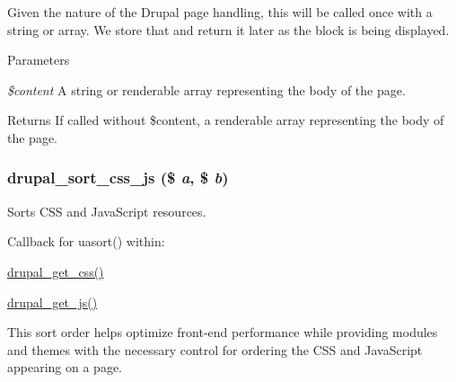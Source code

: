Given the nature of the Drupal page handling, this will be called once with a string or array. We store that and return it later as the block is being displayed.


\begin{DoxyParams}{Parameters}
\item[{\em \$content}]A string or renderable array representing the body of the page.\end{DoxyParams}
\begin{DoxyReturn}{Returns}
If called without \$content, a renderable array representing the body of the page. 
\end{DoxyReturn}
\hypertarget{common_8inc_abfb324a21b713b33d4e3b0eeed5343f3}{
\subsubsection[{drupal\_\-sort\_\-css\_\-js}]{\setlength{\rightskip}{0pt plus 5cm}drupal\_\-sort\_\-css\_\-js (\$ {\em a}, \/  \$ {\em b})}}
\label{common_8inc_abfb324a21b713b33d4e3b0eeed5343f3}
Sorts CSS and JavaScript resources.

Callback for uasort() within:
\begin{DoxyItemize}
\item \hyperlink{common_8inc_a2e308371f339fbb54967045ccbe4e88c}{drupal\_\-get\_\-css()}
\item \hyperlink{common_8inc_ac4d279ffd40eae67ace8459cd3e6e3b5}{drupal\_\-get\_\-js()}
\end{DoxyItemize}

This sort order helps optimize front-\/end performance while providing modules and themes with the necessary control for ordering the CSS and JavaScript appearing on a page.



